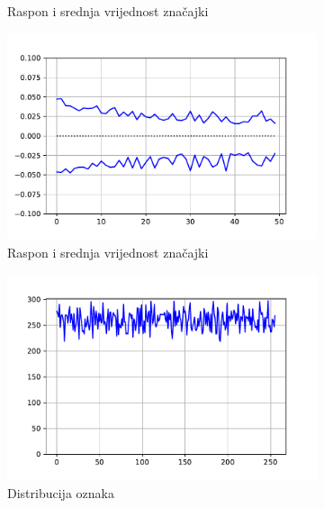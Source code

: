 \documentclass[times, utf8, numeric, diplomski]{fer}
\begin{document}
\begin{figure}[H]
\begin{subfigure}{.5\textwidth}
\centering
\caption{Raspon i srednja vrijednost značajki}
\label{fig:dpa2_train_inputs}
\end{subfigure}
\begin{subfigure}{.5\textwidth}
\includegraphics[width=\textwidth]{ds_nl256_ts_inputs.pdf}
\centering
\caption{Raspon i srednja vrijednost značajki}
\label{fig:dpa2_test_inputs}
\end{subfigure}
\begin{subfigure}{.5\textwidth}
\includegraphics[width=\textwidth]{ds_nl256_tr_outputs.pdf}
\centering
\caption{Distribucija oznaka}
\label{fig:dpa2_train_outputs}
\end{subfigure}
\begin{subfigure}{.5\textwidth}

\end{subfigure}
\end{figure}
\end{document}
